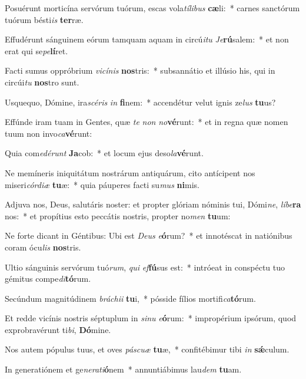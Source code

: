 \item Posuérunt morticína servórum tuórum, escas vola\textit{tí}\textit{li}\textit{bus} \textbf{cæ}li:~* carnes sanctórum tuórum bésti\textit{is} \textbf{ter}ræ.
\item Effudérunt sánguinem eórum tamquam aquam in circú\textit{i}\textit{tu} \textit{Je}\textbf{rú}salem:~* et non erat qui se\textit{pe}\textbf{lí}ret.
\item Facti sumus oppróbrium \textit{vi}\textit{cí}\textit{nis} \textbf{nos}tris:~* subsannátio et illúsio his, qui in circúi\textit{tu} \textbf{nos}tro sunt.
\item Usquequo, Dómine, ira\textit{scé}\textit{ris} \textit{in} \textbf{fi}nem:~* accendétur velut ignis ze\textit{lus} \textbf{tu}us?
\item Effúnde iram tuam in Gentes, quæ \textit{te} \textit{non} \textit{no}\textbf{vé}runt:~* et in regna quæ nomen tuum non invo\textit{ca}\textbf{vé}runt:
\item Quia com\textit{e}\textit{dé}\textit{runt} \textbf{Ja}cob:~* et locum ejus deso\textit{la}\textbf{vé}runt.
\item Ne memíneris iniquitátum nostrárum antiquárum, cito antícipent nos miseri\textit{cór}\textit{di}\textit{æ} \textbf{tu}æ:~* quia páuperes facti su\textit{mus} \textbf{ni}mis.
\item Adjuva nos, Deus, salutáris noster: et propter glóriam nóminis tui, Dómi\textit{ne}, \textit{lí}\textit{be}\textbf{ra} nos:~* et propítius esto peccátis nostris, propter no\textit{men} \textbf{tu}um:
\item Ne forte dicant in Géntibus: Ubi est \textit{De}\textit{us} \textit{e}\textbf{ó}rum?~* et innotéscat in natiónibus coram ócu\textit{lis} \textbf{nos}tris.
\item Ultio sánguinis servórum tuó\textit{rum}, \textit{qui} \textit{ef}\textbf{fú}sus est:~* intróeat in conspéctu tuo gémitus compe\textit{di}\textbf{tó}rum.
\item Secúndum magnitúdinem \textit{brá}\textit{chi}\textit{i} \textbf{tu}i,~* pósside fílios mortifi\textit{ca}\textbf{tó}rum.
\item Et redde vicínis nostris séptuplum in \textit{si}\textit{nu} \textit{e}\textbf{ó}rum:~* impropérium ipsórum, quod exprobravérunt ti\textit{bi}, \textbf{Dó}mine.
\item Nos autem pópulus tuus, et oves \textit{pás}\textit{cu}\textit{æ} \textbf{tu}æ,~* confitébimur tibi \textit{in} \textbf{sǽ}culum.
\item In generatiónem et ge\textit{ne}\textit{ra}\textit{ti}\textbf{ó}nem~* annuntiábimus lau\textit{dem} \textbf{tu}am.
